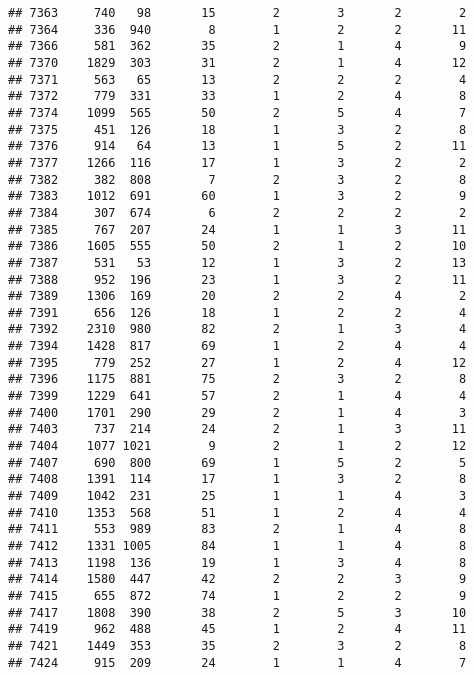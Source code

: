 \documentclass[]{article}
\begin{document}
\begin{verbatim}
## 7363     740   98       15        2        3       2        2
## 7364     336  940        8        1        2       2       11
## 7366     581  362       35        2        1       4        9
## 7370    1829  303       31        2        1       4       12
## 7371     563   65       13        2        2       2        4
## 7372     779  331       33        1        2       4        8
## 7374    1099  565       50        2        5       4        7
## 7375     451  126       18        1        3       2        8
## 7376     914   64       13        1        5       2       11
## 7377    1266  116       17        1        3       2        2
## 7382     382  808        7        2        3       2        8
## 7383    1012  691       60        1        3       2        9
## 7384     307  674        6        2        2       2        2
## 7385     767  207       24        1        1       3       11
## 7386    1605  555       50        2        1       2       10
## 7387     531   53       12        1        3       2       13
## 7388     952  196       23        1        3       2       11
## 7389    1306  169       20        2        2       4        2
## 7391     656  126       18        1        2       2        4
## 7392    2310  980       82        2        1       3        4
## 7394    1428  817       69        1        2       4        4
## 7395     779  252       27        1        2       4       12
## 7396    1175  881       75        2        3       2        8
## 7399    1229  641       57        2        1       4        4
## 7400    1701  290       29        2        1       4        3
## 7403     737  214       24        2        1       3       11
## 7404    1077 1021        9        2        1       2       12
## 7407     690  800       69        1        5       2        5
## 7408    1391  114       17        1        3       2        8
## 7409    1042  231       25        1        1       4        3
## 7410    1353  568       51        1        2       4        4
## 7411     553  989       83        2        1       4        8
## 7412    1331 1005       84        1        1       4        8
## 7413    1198  136       19        1        3       4        8
## 7414    1580  447       42        2        2       3        9
## 7415     655  872       74        1        2       2        9
## 7417    1808  390       38        2        5       3       10
## 7419     962  488       45        1        2       4       11
## 7421    1449  353       35        2        3       2        8
## 7424     915  209       24        1        1       4        7

\end{verbatim}
\end{document}
